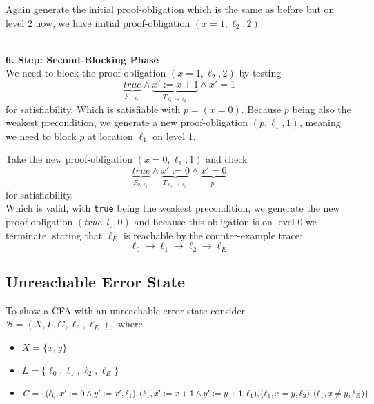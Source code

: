 \documentclass[11pt, a4paper, BCOR=10mm, ngerman, oneside]{scrbook}
\begin{document}
\hspace*{3cm}


Again generate the initial proof-obligation which is the same as before but on level 2 now, we have initial proof-obligation $(x = 1, \ell_2, 2)$ \\ \\ \par

\textbf{6. Step: Second-Blocking Phase} \\
We need to block the proof-obligation $(x = 1, \ell_2, 2)$ by testing
\begin{equation*}
\underbrace{true}_{F_{1, \ell_1}} \land \underbrace{x' := x + 1}_ {T_{\ell_1 \rightarrow \ell_2}} \land x' = 1
\end{equation*}
for satisfiability. Which is satisfiable with $ p = (x = 0)$. Because $p$ being also the weakest precondition, we generate a new proof-obligation $(p, \ell_1, 1)$, meaning we need to block $p$ at location $\ell_1$ on level 1. \par
Take the new proof-obligation $(x=0, \ell_1, 1)$ and check 
\begin{equation*}
\underbrace{true}_{F_{0, \ell_0}} \land \underbrace{x' := 0}_ {T_{\ell_{0} \rightarrow \ell_1}} \land \underbrace{x' = 0}_{p'}
\end{equation*}
for satisfiability. \\
Which is valid, with \texttt{true} being the weakest precondition, we generate the new proof-obligation $(true, l_0, 0)$ and because this obligation is on level 0 we terminate, stating that $\ell_E$ is reachable by the counter-example trace:
\begin{equation*}
\ell_0 \rightarrow \ell_1 \rightarrow \ell_2 \rightarrow \ell_E
\end{equation*}


\pagebreak

\subsection{Unreachable Error State}
To show a CFA with an unreachable error state consider $\mathcal{B} = (X, L, G, \ell_0, \ell_E),$ where
\begin{itemize}
\item $X = \{x, y\}$
\item $L = \{\ell_0, \ell_1, \ell_2, \ell_E\}$
\item $G = \{(\ell_0, x' := 0 \land y' := x', \ell_1), (\ell_1, x' := x+1 \land y' := y+1, \ell_1),\\ (\ell_1, x = y, \ell_2), (\ell_1, x \neq y, \ell_E) \}$
\end{itemize}
\end{document}
